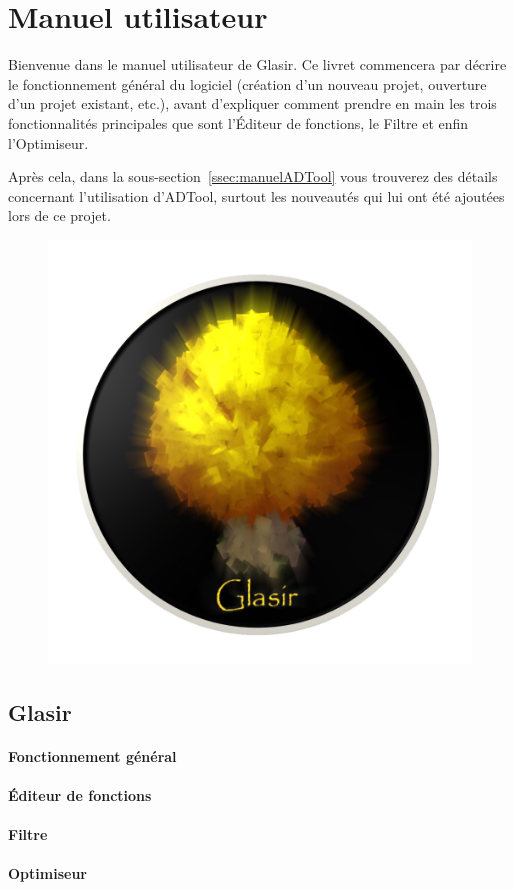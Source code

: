\section{Manuel utilisateur}
\label{sec:manuel}

Bienvenue dans le manuel utilisateur de Glasir. Ce livret commencera par décrire le fonctionnement général du logiciel (création d'un nouveau projet, ouverture d'un projet existant, etc.), avant d'expliquer comment prendre en main les trois fonctionnalités principales que sont l'Éditeur de fonctions, le Filtre et enfin l'Optimiseur. 

Après cela, dans la {\sc sous-section}~\ref{ssec:manuelADTool} vous trouverez des détails concernant l'utilisation d'ADTool, surtout les nouveautés qui lui ont été ajoutées lors de ce projet.

\begin{figure}[!h]
        \centering
        \includegraphics[height=0.3\textwidth]{figure/glasir.png}
    \end{figure}

\subsection{Glasir}
\label{ssec:manuelGlasir}

\paragraph{Fonctionnement général}

\paragraph{Éditeur de fonctions}

\paragraph{Filtre}

\paragraph{Optimiseur}

